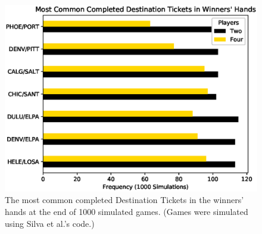 \begin{figure}[!ht]
\centering
\includegraphics[scale=.8]{figures/completed}
\caption{The most common completed
Destination Tickets in the winners'
hands at the end of 1000 simulated games.
(Games were simulated using Silva et al.'s code.)}
\label{fig:completed}
\end{figure}